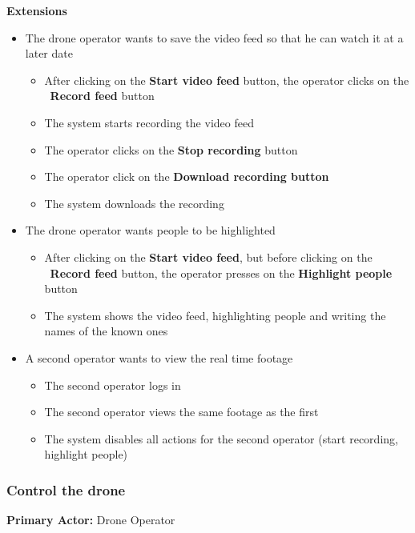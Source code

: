 \textbf{Extensions}
\begin{itemize}
    \item The drone operator wants to save the video feed so that he can watch it at a later date
        \begin{itemize}
            \item After clicking on the \textbf{Start video feed} button, the operator clicks on the \
                    \textbf{Record feed} button
            \item The system starts recording the video feed
            \item The operator clicks on the \textbf{Stop recording} button
            \item The operator click on the \textbf{Download recording button}
            \item The system downloads the recording
        \end{itemize}
    \item The drone operator wants people to be highlighted
            \begin{itemize}
                \item After clicking on the \textbf{Start video feed}, but before clicking on the \
                        \textbf{Record feed} button, the operator presses on the \textbf{Highlight people} button
                \item The system shows the video feed, highlighting people and writing the names of the
                        known ones
            \end{itemize}
    \item A second operator wants to view the real time footage
            \begin{itemize}
                \item The second operator logs in
                \item The second operator views the same footage as the first
                \item The system disables all actions for the second operator (start recording, highlight people)
            \end{itemize}
\end{itemize}

\subsubsection{Control the drone}

\textbf{Primary Actor:} Drone Operator

